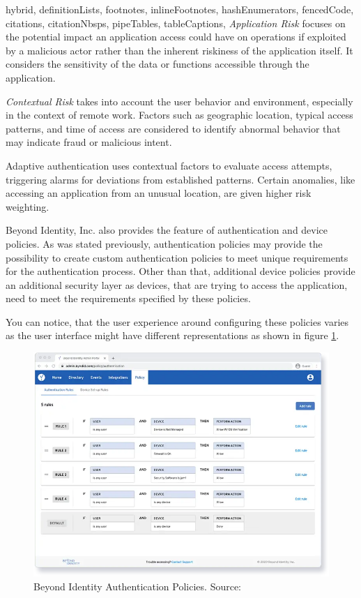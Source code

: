 \documentclass[
  digital,     %
  oneside,     %
  nosansbold,  %
  nocolorbold, %
  lof,         %
  lot,         %
]{fithesis4}
\begin{document}
\begin{markdown*}{%
  hybrid,
  definitionLists,
  footnotes,
  inlineFootnotes,
  hashEnumerators,
  fencedCode,
  citations,
  citationNbsps,
  pipeTables,
  tableCaptions,
}
\textit{Application Risk} focuses on the potential impact an application access could have on operations if exploited by a malicious actor rather than the inherent riskiness of the application itself.
It considers the sensitivity of the data or functions accessible through the application.

\textit{Contextual Risk} takes into account the user behavior and environment, especially in the context of remote work.
Factors such as geographic location, typical access patterns, and time of access are considered to identify abnormal behavior that may indicate fraud or malicious intent.

Adaptive authentication uses contextual factors to evaluate access attempts, triggering alarms for deviations from established patterns.
Certain anomalies, like accessing an application from an unusual location, are given higher risk weighting.

Beyond Identity, Inc. also provides the feature of authentication and device policies.
As was stated previously, authentication policies may provide the possibility to create custom authentication policies to meet unique requirements for the authentication process.
Other than that, additional device policies provide an additional security layer as devices, that are trying to access the application, need to meet the requirements specified by these policies.

You can notice, that the user experience around configuring these policies varies as the user interface might have different representations as shown in figure \ref{fig:beyond-identity-auth-policy}. \cite{existing-beyond-identity}

\begin{figure}[htbp]
  \centering
  \includegraphics[width=1\textwidth]{img/beyond-auth-policy.png}
  \caption[Beyond Identity Authentication Policies]{Beyond Identity Authentication Policies. Source: \cite{existing-beyond-identity}}
  \label{fig:beyond-identity-auth-policy}
\end{figure}


\end{markdown*}
\end{document}
